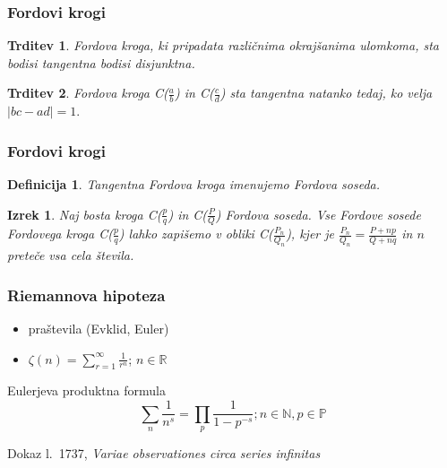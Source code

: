 \documentclass{beamer}
\newtheorem{izrek}{Izrek}
\newtheorem{definicija}{Definicija}
\newtheorem{trditev}{Trditev}
\begin{document}

\begin{frame}
\frametitle{Fordovi krogi}

\begin{trditev}
\label{trd:FordDisjTang}
Fordova kroga, ki pripadata različnima okrajšanima ulomkoma, sta bodisi tangentna bodisi disjunktna.
\end{trditev}

\pause
\begin{trditev}
\label{trd:FordTangentnost}
Fordova kroga C($\frac{a}{b}$) in C($\frac{c}{d}$) sta tangentna natanko tedaj, ko velja \( |bc-ad|=1. \)
\end{trditev}

\end{frame}


\begin{frame}
\frametitle{Fordovi krogi}

\begin{definicija}
Tangentna Fordova kroga imenujemo \emph{Fordova soseda}.
\end{definicija}

\pause
\begin{izrek}
Naj bosta kroga C($\frac{p}{q}$) in C($\frac{P}{Q}$) Fordova soseda. Vse Fordove sosede Fordovega kroga C($\frac{p}{q}$) lahko zapišemo v obliki C($\frac{P_n}{Q_n}$), kjer je $\frac{P_n}{Q_n} = \frac{P+np}{Q+nq}$ in $n$ preteče vsa cela števila.
\end{izrek}

\end{frame}


\begin{frame}
\frametitle{Riemannova hipoteza}

\begin{itemize}
\pause
\item praštevila (Evklid, Euler)
%
\pause
\item $ \zeta(n) = \sum_{r=1}^{\infty}\frac{1}{r^n} $;  $n\in\mathbb{R}$
\end{itemize}

\pause
\begin{block}{Eulerjeva produktna formula}
\[ \sum_{n}\frac{1}{n^s} = \prod_{p}\frac{1}{1-p^{-s}}; n\in\mathbb{N}, p\in\mathbb{P} \]
\end{block}

Dokaz l.~1737, \emph{Variae observationes circa series infinitas}

\end{frame}
\end{document}
